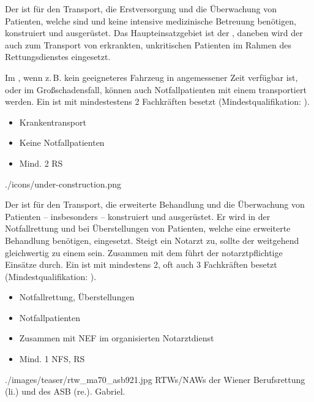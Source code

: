 {%
%
%
Der  ist für den Transport, die Erstversorgung und
die Überwachung von Patienten, welche  sind und keine intensive medizinische
Betreuung benötigen, konstruiert und ausgerüstet.
Das Haupteinsatzgebiet ist der , daneben
wird der  auch zum Transport von erkrankten,
unkritischen Patienten im Rahmen des Rettungsdienstes
eingesetzt.

Im , wenn z.\,B. kein geeigneteres Fahrzeug
in angemessener Zeit verfügbar ist, oder im Großschadensfall,
können auch Notfallpatienten mit einem 
transportiert werden.
Ein  ist mit mindestestens 2 Fachkräften besetzt
(Mindestqualifikation: ).


}{
\begin{itemize}
  \item Krankentransport
  \item Keine Notfallpatienten
  \item Mind. 2 RS
\end{itemize}
}
{./icons/under-construction.png}
{}
{}

{%
%
%
Der  ist für den Transport, die erweiterte
Behandlung und die Überwachung von Patienten -- insbesonders
 -- konstruiert und ausgerüstet. Er
wird in der Notfallrettung und bei Überstellungen von Patienten,
welche eine erweiterte Behandlung benötigen, eingesetzt.
Steigt ein Notarzt zu, sollte der  weitgehend
gleichwertig zu einem  sein.
Zusammen mit dem  führt der 
notarztpflichtige Einsätze durch.
Ein  ist mit mindestens 2, oft auch 3 Fachkräften besetzt
(Mindestqualifikation: ).

}{
\begin{itemize}
  \item Notfallrettung, Überstellungen 
  \item Notfallpatienten
  \item Zusammen mit NEF im organisierten Notarztdienst
  \item Mind. 1 NFS,  RS
\end{itemize}
}
{./images/teaser/rtw_ma70_asb921.jpg}
{RTWs/NAWs der Wiener Berufsrettung (li.) und des ASB (re.).}
{Gabriel.}


